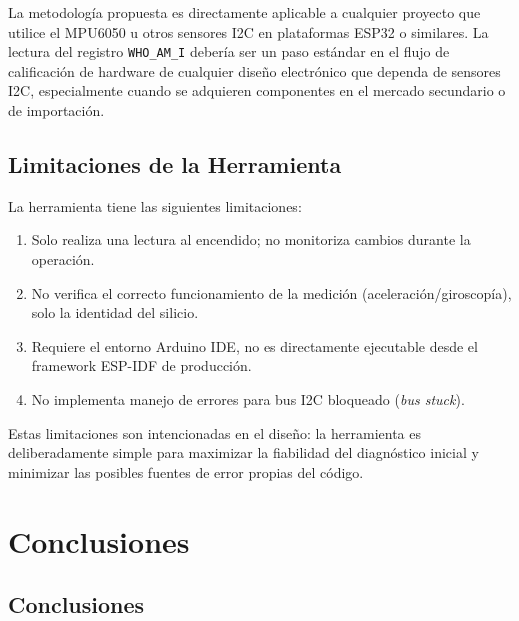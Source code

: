 \documentclass[10pt,twocolumn,a4paper]{article}
\begin{document}
La metodología propuesta es directamente aplicable a cualquier proyecto
que utilice el MPU6050 u otros sensores I2C en plataformas ESP32 o
similares. La lectura del registro \texttt{WHO\_AM\_I} debería ser un
paso estándar en el flujo de calificación de hardware de cualquier
diseño electrónico que dependa de sensores I2C, especialmente cuando
se adquieren componentes en el mercado secundario o de importación.

\subsection{Limitaciones de la Herramienta}

La herramienta tiene las siguientes limitaciones:
\begin{enumerate}
  \item Solo realiza una lectura al encendido; no monitoriza cambios
        durante la operación.
  \item No verifica el correcto funcionamiento de la medición
        (aceleración/giroscopía), solo la identidad del silicio.
  \item Requiere el entorno Arduino IDE, no es directamente ejecutable
        desde el framework ESP-IDF de producción.
  \item No implementa manejo de errores para bus I2C bloqueado
        (\textit{bus stuck}).
\end{enumerate}

Estas limitaciones son intencionadas en el diseño: la herramienta
es deliberadamente simple para maximizar la fiabilidad del diagnóstico
inicial y minimizar las posibles fuentes de error propias del código.

\section{Conclusiones}
\label{sec:conclusiones}

\subsection{Conclusiones}
\end{document}
